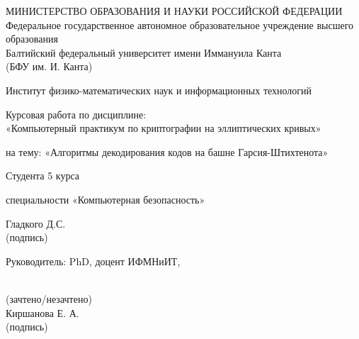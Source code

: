 \begin{titlepage}
	\newpage
	
	\begin{center}
		МИНИСТЕРСТВО ОБРАЗОВАНИЯ И НАУКИ РОССИЙСКОЙ ФЕДЕРАЦИИ \\
		Федеральное государственное автономное образовательное учреждение
		высшего образования \\
		Балтийский федеральный университет имени Иммануила Канта \\
		(БФУ им. И. Канта)
	\end{center}

	\vspace{2em}

	\begin{center}
		Институт физико-математических наук и информационных технологий
	\end{center}
	
	\vspace{2em}
	
	\begin{center}
		Курсовая работа по дисциплине: \\
		{\large «Компьютерный практикум по криптографии на эллиптических кривых»}
	\end{center}
	
	\vspace{1em}
	
	\begin{center}
		на тему: {\large «Алгоритмы декодирования кодов на башне Гарсия-Штихтенота»}
	\end{center}
	
	\vspace{2em}

	\begin{flushright}
		Студента 5 курса
	\end{flushright}
	\begin{flushright}
 		специальности «Компьютерная безопасность»
	\end{flushright}
	\begin{flushright}
		\underline{\hspace{5.0cm}} Гладкого Д.С. \\
		{\scriptsize(подпись)}~~~~~~~~~~~~~~~~~~~~~~~~~~~~~~~~~~~~~
	\end{flushright}

	\vspace{2em}

	\begin{flushright}
		Руководитель: PhD, доцент ИФМНиИТ, 
	\end{flushright}
	\begin{flushright}
		\underline{\hspace{2.6cm}} \\
		{\scriptsize(зачтено/незачтено)} \\
		\vspace{1em}
		\underline{\hspace{2.6cm}} Киршанова Е. А. \\
		{\scriptsize(подпись)}~~~~~~~~~~~~~~~~~~~~~~~~~~~~~~~
	\end{flushright}


\end{titlepage}
